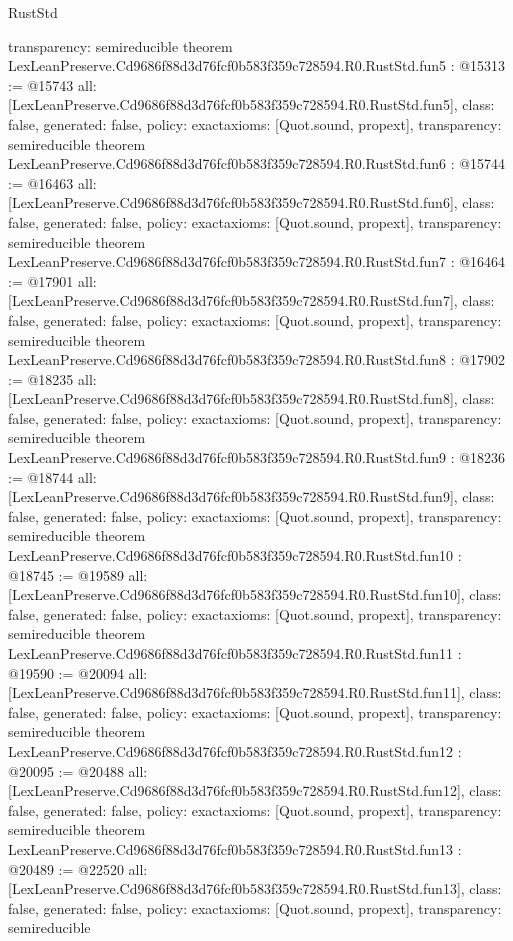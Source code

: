 \begin{lexlean}{RustStd}
\begin{coremodule}
{  transparency: semireducible
}
theorem LexLeanPreserve.Cd9686f88d3d76fcf0b583f359c728594.R0.RustStd.fun5 : @15313 := @15743 {
  all: [LexLeanPreserve.Cd9686f88d3d76fcf0b583f359c728594.R0.RustStd.fun5],
  class: false,
  generated: false,
  policy: exact{axioms: [Quot.sound, propext]},
  transparency: semireducible
}
theorem LexLeanPreserve.Cd9686f88d3d76fcf0b583f359c728594.R0.RustStd.fun6 : @15744 := @16463 {
  all: [LexLeanPreserve.Cd9686f88d3d76fcf0b583f359c728594.R0.RustStd.fun6],
  class: false,
  generated: false,
  policy: exact{axioms: [Quot.sound, propext]},
  transparency: semireducible
}
theorem LexLeanPreserve.Cd9686f88d3d76fcf0b583f359c728594.R0.RustStd.fun7 : @16464 := @17901 {
  all: [LexLeanPreserve.Cd9686f88d3d76fcf0b583f359c728594.R0.RustStd.fun7],
  class: false,
  generated: false,
  policy: exact{axioms: [Quot.sound, propext]},
  transparency: semireducible
}
theorem LexLeanPreserve.Cd9686f88d3d76fcf0b583f359c728594.R0.RustStd.fun8 : @17902 := @18235 {
  all: [LexLeanPreserve.Cd9686f88d3d76fcf0b583f359c728594.R0.RustStd.fun8],
  class: false,
  generated: false,
  policy: exact{axioms: [Quot.sound, propext]},
  transparency: semireducible
}
theorem LexLeanPreserve.Cd9686f88d3d76fcf0b583f359c728594.R0.RustStd.fun9 : @18236 := @18744 {
  all: [LexLeanPreserve.Cd9686f88d3d76fcf0b583f359c728594.R0.RustStd.fun9],
  class: false,
  generated: false,
  policy: exact{axioms: [Quot.sound, propext]},
  transparency: semireducible
}
theorem LexLeanPreserve.Cd9686f88d3d76fcf0b583f359c728594.R0.RustStd.fun10 : @18745 := @19589 {
  all: [LexLeanPreserve.Cd9686f88d3d76fcf0b583f359c728594.R0.RustStd.fun10],
  class: false,
  generated: false,
  policy: exact{axioms: [Quot.sound, propext]},
  transparency: semireducible
}
theorem LexLeanPreserve.Cd9686f88d3d76fcf0b583f359c728594.R0.RustStd.fun11 : @19590 := @20094 {
  all: [LexLeanPreserve.Cd9686f88d3d76fcf0b583f359c728594.R0.RustStd.fun11],
  class: false,
  generated: false,
  policy: exact{axioms: [Quot.sound, propext]},
  transparency: semireducible
}
theorem LexLeanPreserve.Cd9686f88d3d76fcf0b583f359c728594.R0.RustStd.fun12 : @20095 := @20488 {
  all: [LexLeanPreserve.Cd9686f88d3d76fcf0b583f359c728594.R0.RustStd.fun12],
  class: false,
  generated: false,
  policy: exact{axioms: [Quot.sound, propext]},
  transparency: semireducible
}
theorem LexLeanPreserve.Cd9686f88d3d76fcf0b583f359c728594.R0.RustStd.fun13 : @20489 := @22520 {
  all: [LexLeanPreserve.Cd9686f88d3d76fcf0b583f359c728594.R0.RustStd.fun13],
  class: false,
  generated: false,
  policy: exact{axioms: [Quot.sound, propext]},
  transparency: semireducible
}
\end{coremodule}
\end{lexlean}
